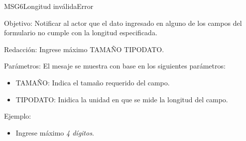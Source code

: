 \begin{mensaje}{MSG6}{Longitud inválida}{Error}
	\item [Objetivo:] Notificar al actor que el dato ingresado en alguno de los campos del formulario no cumple con la longitud especificada.
	\item[Redacción:] Ingrese máximo TAMAÑO TIPODATO.
	\item[Parámetros:] El mesaje se muestra con base en los siguientes parámetros:
		\begin{itemize}
 			\item TAMAÑO: Indica el tamaño requerido del campo.
 			\item TIPODATO: Inidica la unidad en que se mide la longitud del campo.
		\end{itemize}
	\item[Ejemplo:] 
	\begin{itemize}
		\item Ingrese máximo {\em 4 dígitos}.
	\end{itemize}
\end{mensaje}